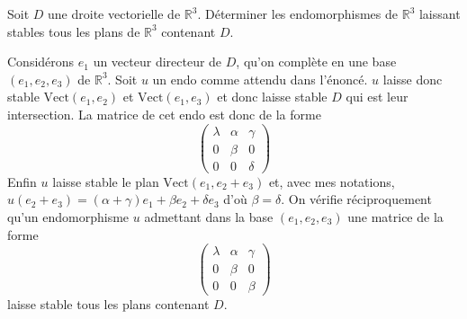 \documentclass[answers,11pt]{exam}
\newcommand{\RR}{\mathbb{R}}
\begin{document}
\begin{questions}
\question Soit $D$ une droite vectorielle de $\RR^3$. Déterminer les endomorphismes de $\RR^3$ laissant stables tous les plans de $\RR^3$ contenant $D$.

\begin{solution}
	Considérons $e_1$ un vecteur directeur de $D$, qu'on complète en une base $(e_1,e_2,e_3)$ de $\RR^3$. Soit $u$ un endo comme attendu dans l'énoncé. $u$ laisse donc stable $\mathrm{Vect}(e_1,e_2)$ et $\mathrm{Vect}(e_1,e_3)$ et donc laisse stable $D$ qui est leur intersection. La matrice de cet endo est donc de la forme \[ \begin{pmatrix}
		\lambda & \alpha & \gamma \\
		0 & \beta & 0 \\
		0 & 0 & \delta
	\end{pmatrix}
	 \]
	 Enfin $u$ laisse stable le plan $\mathrm{Vect}(e_1,e_2+e_3)$ et, avec mes notations, $u(e_2+e_3)=(\alpha + \gamma)e_1 + \beta e_2 + \delta e_3$ d'où $\beta=\delta$. On vérifie réciproquement qu'un endomorphisme $u$ admettant dans la base $(e_1,e_2,e_3)$ une matrice de la forme \[ \begin{pmatrix}
		\lambda & \alpha & \gamma \\
		0 & \beta & 0 \\
		0 & 0 & \beta
	\end{pmatrix}
	 \]
	 laisse stable tous les plans contenant $D$.
\end{solution}

\question 
{}


\end{questions}
\end{document}

